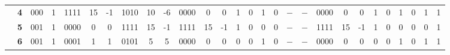 \begin{figure}[H]
\begin{tcolorbox}[left=5mm,right=5mm,top=0mm,bottom=5mm,boxsep=0mm,
toptitle=0.5mm,bottomtitle=0.5mm,title=Resultados Teóricos \textit{versus} Resultados Experimentais,center title]
\begin{minipage}{\textwidth}
{\begin{tabular}{c|c|c|c|c|c|c|c|c|c|c|c|c|c|c|c|c|c|c|c|c|c|c|c|c|c|c|c|}
\cline{2-28}
                                                                                                           & \textbf{4}           & 000                  & 1                    & 1111                 & 15                                          & -1                                          & 1010                 & 10                                          & -6                                          & 0000                 & 0                                           & 0                                           & 1                    & 0                    & 1                    & 0                    & $-$                    & $-$                    & 0000                 & 0                                           & 0                                           & 1                    & 0                    & 1                    & 0                    & 1                    & 1                     \\ 
\cline{2-28}
                                                                                                           & \textbf{5}           & 001                  & 1                    & 0000                 & 0                                           & 0                                           & 1111                 & 15                                          & -1                                          & 1111                 & 15                                          & -1                                          & 1                    & 0                    & 0                    & 0                    & $-$                    & $-$                    & 1111                 & 15                                          & -1                                          & 1                    & 0                    & 0                    & 0                    & 0                    & 1                     \\ 
\cline{2-28}
                                                                                                           & \textbf{6}           & 001                  & 1                    & 0001                 & 1                                           & 1                                           & 0101                 & 5                                           & 5                                           & 0000                 & 0                                           & 0                                           & 0                    & 0                    & 1                    & 0                    & $-$                    & $-$                    & 0000                 & 0                                           & 0                                           & 0                    & 0                    & 1                    & 0                    & 1                    & 1                     \\ 

\end{tabular}}
\end{minipage}
\end{tcolorbox}
\end{figure}
